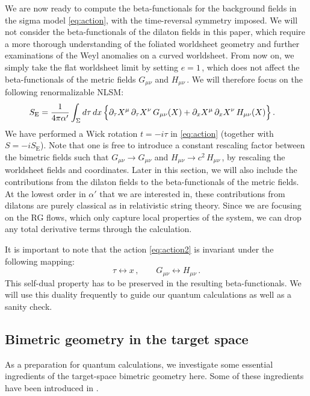 \documentclass[11pt]{article}
\newcommand{\be}{\begin{equation}}
\newcommand{\ee}{\end{equation}}
\newcommand{\p}{\partial}
\begin{document}
We are now ready to compute the beta-functionals for the background fields in the sigma model \eqref{eq:action}, with the time-reversal symmetry imposed. We will not consider the beta-functionals of the dilaton fields in this paper, which require a more thorough understanding of the foliated worldsheet geometry and further examinations of the Weyl anomalies on a curved worldsheet. From now on, we simply take the flat worldsheet limit by setting $e = 1$\,, which does not affect the beta-functionals of the metric fields $G_{\mu\nu}$ and $H_{\mu\nu}$\,. We will therefore focus on the following renormalizable NLSM:
%
\begin{align} \label{eq:action2}
\begin{split}
	S_\text{E} & = \frac{1}{4\pi \alpha'} \int_\Sigma d\tau \, dx \, \Bigl\{ \p_\tau X^\mu \, \p_\tau X^\nu \, G_{\mu\nu} (X) + \p_x X^\mu \, \p_x X^\nu \, H_{\mu\nu} (X) \Bigr\}\,.
\end{split}
\end{align}
%
We have performed a Wick rotation $t = - i \tau$ in \eqref{eq:action} (together with $S = - i S_\text{E}$). Note that one is free to introduce a constant rescaling factor between the bimetric fields such that $G_{\mu\nu} \rightarrow G_{\mu\nu}$ and $H_{\mu\nu} \rightarrow c^2 \, H_{\mu\nu}$\,, by rescaling the worldsheet fields and coordinates.
Later in this section, we will also include the contributions from the dilaton fields to the beta-functionals of the metric fields. At the lowest order in $\alpha'$ that we are interested in, these contributions from dilatons are purely classical as in relativistic string theory. Since we are focusing on the RG flows, which only capture local properties of the system, we can drop any total derivative terms through the calculation. 

It is important to note that the action \eqref{eq:action2} is invariant under the following mapping:
%
\be \label{eq:swap}
	\tau \longleftrightarrow x\,,
		\qquad
	G_{\mu\nu} \longleftrightarrow H_{\mu\nu}\,.
\ee
%
This self-dual property has to be preserved in the resulting beta-functionals. We will use this duality frequently to guide our quantum calculations as well as a sanity check.

\subsection{Bimetric geometry in the target space}

As a preparation for quantum calculations, we investigate some essential ingredients of the target-space bimetric geometry here. Some of these ingredients have been introduced in \cite{Rosen:1940zza, Rosen:1940zz}. 
\end{document}
